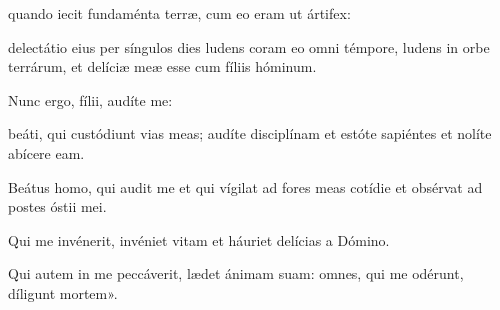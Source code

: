 {\noindent quando iecit fundaménta terræ, cum eo eram ut ártifex:

\noindent delectátio eius per síngulos dies ludens coram eo omni témpore, ludens in orbe terrárum, et delíciæ meæ esse cum fíliis hóminum.

\noindent Nunc ergo, fílii, audíte me:

\noindent beáti, qui custódiunt vias meas; audíte disciplínam et estóte sapiéntes et nolíte abícere eam.

\noindent Beátus homo, qui audit me et qui vígilat ad fores meas cotídie et obsérvat ad postes óstii mei.

\noindent Qui me invénerit, invéniet vitam et háuriet delícias a Dómino.

\noindent Qui autem in me peccáverit, lædet ánimam suam: omnes, qui me odérunt, díligunt mortem».}
\newcommand{\responsoriumi}{\pars{Responsorium 1.} \scriptura{\Rbardot{} Prv. 8, 23-25 \Vbardot{} ibid. 8, 26.30; \textbf{H398}}

\vspace{-5mm}

\responsorium{I}{temporalia/resp-inprincipiodeusantequam-CROCHU.gtex}{}

\rubrica{vel ad libitum:}

\vspace{3mm}

\pars{Responsorium 1.} \scriptura{\Rbardot{} Eccli. 24, 8-11 \Vbardot{} ibid. 24, 7; \textbf{H399}}

\vspace{-5mm}

\responsorium{VI}{temporalia/resp-gyrumcaeli-CROCHU.gtex}{}}
\newcommand{\lectioii}{\pars{Lectio II.} \scriptura{Catéchisme sur la prière: A. Monnin, Esprit du Curé d’Ars, Parisius 1899, pp. 87-89}

\noindent Ex catechési sancti Ioánnis Maríæ Vianney presbýteri.

\noindent Consideráte, filíoli mei: thesáurus hóminis christiáni non in terris est, sed in cælis. Cogitátio ígitur nostra illuc convérti debet ubi est thesáurus noster.

\noindent Hoc pulchrum est hóminis munus et offícium: ut oret ac díligat. Si vos orátis ac dilígitis, ecce, hæc est beatitúdo hóminis super terram.

\noindent Orátio nihil áliud est nisi únio cum Deo. Quando cor mundum áliquis habet et cum Deo coniúnctum, suavitáte quadam et dulcédine affícitur quæ inébriat, lúmine quod mire circumfúlget. In hac íntima unióne, Deus et ánima velut duæ ceræ sunt simul conflátæ, quas nemo ámplius separáre potest. Res pulchérrima est hæc Dei coniúnctio cum parva creatúra sua; felícitas hæc est, quæ comprehéndi non potest.

\noindent Nos indígni evaserámus qui orarémus; Deus vero, ut bonus est, permísit nobis ut cum ipso loquerémur. Orátio nostra incénsum est quod máxime illi placet.}
